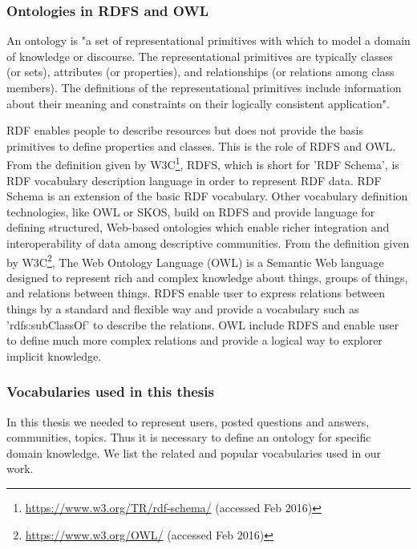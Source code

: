 \subsubsection{Ontologies in RDFS and OWL}
An ontology is "a set of representational primitives with which to model a domain of knowledge or discourse. The representational primitives are typically classes (or sets), attributes (or properties), and relationships (or relations among class members). The definitions of the representational primitives include information about their meaning and constraints on their logically consistent application"\cite{liu2009encyclopedia}.

RDF enables people to describe resources but does not provide the basis primitives to define properties and classes. This is the role of RDFS and OWL. From the definition given by W3C\footnote{\url{https://www.w3.org/TR/rdf-schema/} (accessed Feb 2016)}, RDFS, which is short for 'RDF Schema', is RDF vocabulary description language in order to represent RDF data. RDF Schema is an extension of the basic RDF vocabulary. Other vocabulary definition technologies, like OWL or SKOS, build on RDFS and provide language for defining structured, Web-based ontologies which enable richer integration and interoperability of data among descriptive communities. From the definition given by W3C\footnote{\url{https://www.w3.org/OWL/} (accessed Feb 2016)}, The Web Ontology Language (OWL) is a Semantic Web language designed to represent rich and complex knowledge about things, groups of things, and relations between things. RDFS enable user to express relations between things by a standard and flexible way and provide a vocabulary such as 'rdfs:subClassOf' to describe the relations. OWL include RDFS and enable user to define much more complex relations and provide a logical way to explorer implicit knowledge. 



\subsubsection{Vocabularies used in this thesis}
In this thesis we needed to represent users, posted questions and answers, communities, topics. Thus it is necessary to define an ontology for specific domain knowledge. We list the related and popular vocabularies used in our work.


